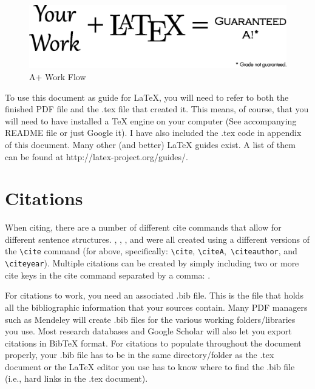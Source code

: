 \documentclass[12pt]{article}
\begin{document}
\begin{figure}[h!]
\caption{A+ Work Flow}
\noindent \includegraphics[width=\linewidth]{aplus.eps}
\end{figure}

To use this document as guide for \LaTeX{}, you will need to refer to
both  the finished PDF file and the .tex file that created it. This means, 
of course, that you will need to have installed a TeX engine on your computer 
(See accompanying README file or just Google it). I have also included the 
.tex code in appendix of this document. Many other (and better) \LaTeX{} guides exist. 
A list of them can be found at http://latex-project.org/guides/.


\section{Citations}

When citing, there are a number of different cite commands that allow
for  different sentence structures. \cite{strongrule2012wizards},
, \citeauthor{strongrule2012wizards}, and
\citeyear{strongrule2012wizards} were all created using a different versions of
the {\tt \textbackslash{cite}} command (for above, specifically:
{\tt \textbackslash{cite}}, {\tt \textbackslash{citeA}},{\tt
  \textbackslash{citeauthor}}, and {\tt \textbackslash{citeyear}}). Multiple 
citations can be created by simply including two or more cite keys in the cite
 command separated by a comma: 
\cite{philosophicus1927agenda, strongrule2012wizards}.


For citations to work, you need an associated .bib file. This is the file 
that holds all the bibliographic information that your sources contain. Many 
PDF managers such as Mendeley will create .bib files for the various working 
folders/libraries you use. Most research databases and Google Scholar will also 
let you export citations in BibTeX format. For citations to populate throughout 
the document properly, your .bib file has to be in the same directory/folder as 
the .tex document or the \LaTeX{} editor you use has to know where to find the 
.bib file (i.e., hard links in the .tex document).
\end{document}
